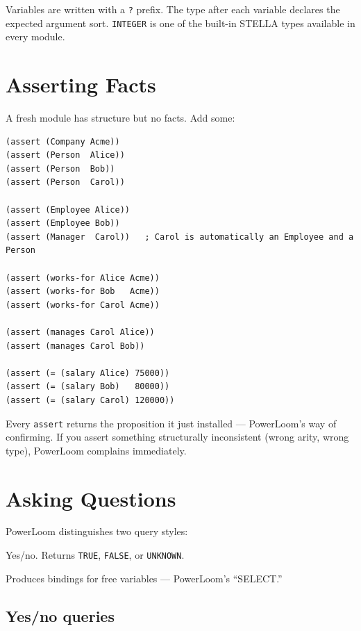 \documentclass[11pt,letterpaper]{article}
\newcommand{\cmd}[1]{\texttt{#1}}
\begin{document}
\noindent Variables are written with a \cmd{?} prefix. The type after each
variable declares the expected argument sort. \cmd{INTEGER} is one of the
built-in STELLA types available in every module.

\section{Asserting Facts}
\label{sec:assert}

A fresh module has structure but no facts. Add some:

\begin{lstlisting}
(assert (Company Acme))
(assert (Person  Alice))
(assert (Person  Bob))
(assert (Person  Carol))

(assert (Employee Alice))
(assert (Employee Bob))
(assert (Manager  Carol))   ; Carol is automatically an Employee and a Person

(assert (works-for Alice Acme))
(assert (works-for Bob   Acme))
(assert (works-for Carol Acme))

(assert (manages Carol Alice))
(assert (manages Carol Bob))

(assert (= (salary Alice) 75000))
(assert (= (salary Bob)   80000))
(assert (= (salary Carol) 120000))
\end{lstlisting}

\noindent Every \cmd{assert} returns the proposition it just installed ---
PowerLoom's way of confirming. If you assert something structurally
inconsistent (wrong arity, wrong type), PowerLoom complains immediately.

\section{Asking Questions}
\label{sec:ask}

PowerLoom distinguishes two query styles:

\begin{description}[nosep,style=nextline]
  \item[\cmd{ask}] Yes/no. Returns \cmd{TRUE}, \cmd{FALSE}, or
    \cmd{UNKNOWN}.
  \item[\cmd{retrieve}] Produces bindings for free variables ---
    PowerLoom's ``SELECT.''
\end{description}

\subsection{Yes/no queries}
\end{document}
